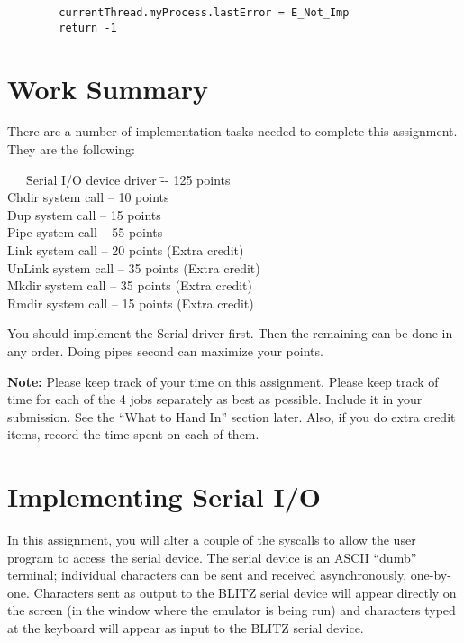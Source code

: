 \documentclass[11pt]{article}
\begin{document}
\begin{verbatim}
	    currentThread.myProcess.lastError = E_Not_Imp
	    return -1
\end{verbatim}


\section{Work Summary}
There are a number of implementation tasks needed to complete
this assignment.  They are the following:
\begin{tabbing}
\ \ \  \= Serial I/O device driver \= -- 125 points \\
\> Chdir system call \> -- 10 points \\
\> Dup system call \> -- 15 points \\
\> Pipe system call \> -- 55 points \\
\> Link system call \> -- 20 points (Extra credit)\\
\> UnLink system call \> -- 35 points (Extra credit) \\
\> Mkdir system call \> -- 35 points (Extra credit)\\
\> Rmdir system call \> -- 15 points (Extra credit)\\
\end{tabbing}

You should implement the Serial driver first.  Then the remaining
can be done in any order.  Doing pipes second can maximize your
points.

{\bf Note:} Please keep track of your time on this assignment.  Please
keep track of time for each of the 4 jobs separately as best as
possible.  Include it in your submission.  See the ``What to Hand In''
section later.   Also, if you do extra credit items, record the
time spent on each of them.


\section{Implementing Serial I/O}

In this assignment, you will alter a couple of the syscalls to allow
the user program to access the serial device.  The serial device is an
ASCII ``dumb'' terminal; individual characters can be sent and received
asynchronously, one-by-one.  Characters sent as output to the BLITZ
serial device will appear directly on the screen (in the window where
the emulator is being run) and characters typed at the keyboard will
appear as input to the BLITZ serial device.
\end{document}
